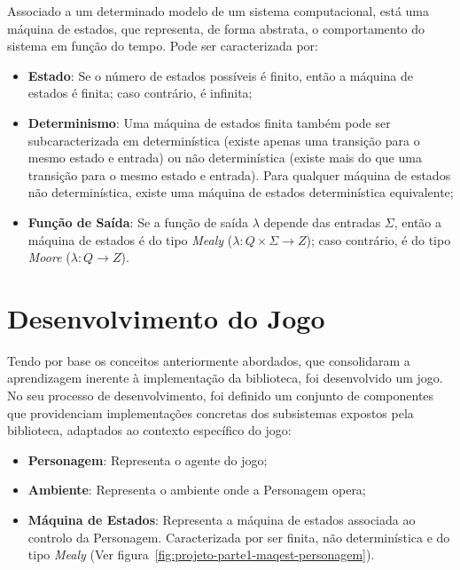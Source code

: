 Associado a um determinado modelo de um sistema computacional, está uma máquina de estados, que representa, de forma abstrata, o comportamento do sistema em função do tempo. Pode ser caracterizada por:

\begin{itemize}
    \item \textbf{Estado}: Se o número de estados possíveis é finito, então a máquina de estados é finita; caso contrário, é infinita;
    \item \textbf{Determinismo}: Uma máquina de estados finita também pode ser subcaracterizada em determinística (existe apenas uma transição para o mesmo estado e entrada) ou não determinística (existe mais do que uma transição para o mesmo estado e entrada).
    Para qualquer máquina de estados não determinística, existe uma máquina de estados determinística equivalente; \cite{wiki:finite-state-machine,freecodecamp:state-machines}
    \item \textbf{Função de Saída}: Se a função de saída $\lambda$ depende das entradas $\Sigma$, então a máquina de estados é do tipo \textit{Mealy} ($\lambda : Q \times \Sigma \rightarrow Z$); caso contrário, é do tipo \textit{Moore} ($\lambda : Q \rightarrow Z$).
\end{itemize}


\section{Desenvolvimento do Jogo}\label{sec:desenvolvimento-do-jogo}

Tendo por base os conceitos anteriormente abordados, que consolidaram a aprendizagem inerente à implementação da biblioteca, foi desenvolvido um jogo. No seu processo de desenvolvimento, foi definido um conjunto de componentes que providenciam implementações concretas dos subsistemas expostos pela biblioteca, adaptados ao contexto específico do jogo:

\begin{itemize}
    \item \textbf{Personagem}: Representa o agente do jogo;
    \item \textbf{Ambiente}: Representa o ambiente onde a Personagem opera;
    \item \textbf{Máquina de Estados}: Representa a máquina de estados associada ao controlo da Personagem.
    Caracterizada por ser finita, não determinística e do tipo \textit{Mealy} (Ver figura~\ref{fig:projeto-parte1-maqest-personagem}).
\end{itemize}

